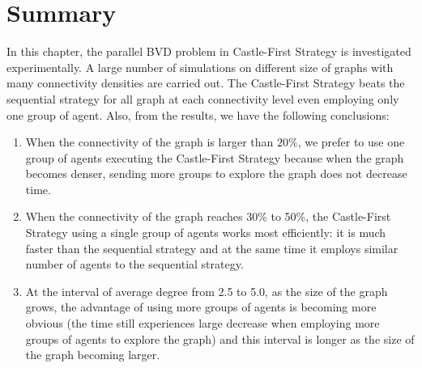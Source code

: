 \section{Summary}
\color{blue}
In this chapter, the parallel BVD problem in Castle-First Strategy is investigated experimentally. A large number of simulations on different size of graphs with many connectivity densities are carried out. The Castle-First Strategy beats the sequential strategy for all graph at each connectivity level even employing only one group of agent. Also, from the results, we have the following conclusions:
\begin{enumerate}
\item When the connectivity of the graph is larger than $20\%$, we prefer to use one group of agents executing the Castle-First Strategy because when the graph becomes denser, sending more groups to explore the graph does not decrease time.
\item When the connectivity of the graph reaches 30\% to 50\%, the Castle-First Strategy using a single group of agents works most efficiently: it is much faster than the sequential strategy and at the same time it employs similar number of agents to the sequential strategy.
\item At the interval of average degree from 2.5 to 5.0, as the size of the graph grows, the advantage of using more groups of agents is becoming more obvious (the time still experiences large decrease when employing more groups of agents to explore the graph) and this interval is longer as the size of the graph becoming larger.
\end{enumerate}

\color{black}













